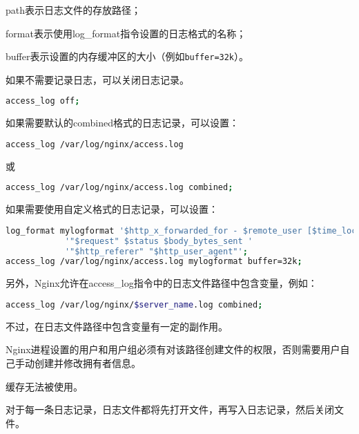 \begin{compactitem}
\item path表示日志文件的存放路径；
\item format表示使用log\_format指令设置的日志格式的名称；
\item buffer表示设置的内存缓冲区的大小（例如\texttt{buffer=32k}）。
\end{compactitem}

\begin{compactenum}
\item 如果不需要记录日志，可以关闭日志记录。

\begin{lstlisting}[language=bash]
access_log off;
\end{lstlisting}

\item 如果需要默认的combined格式的日志记录，可以设置：

\begin{lstlisting}[language=bash]
access_log /var/log/nginx/access.log
\end{lstlisting}

或

\begin{lstlisting}[language=bash]
access_log /var/log/nginx/access.log combined;
\end{lstlisting}

\item 如果需要使用自定义格式的日志记录，可以设置：

\begin{lstlisting}[language=bash]
log_format mylogformat '$http_x_forwarded_for - $remote_user [$time_local] '
			'"$request" $status $body_bytes_sent '
			'"$http_referer" "$http_user_agent"';
access_log /var/log/nginx/access.log mylogformat buffer=32k;
\end{lstlisting}


\end{compactenum}

另外，Nginx允许在access\_log指令中的日志文件路径中包含变量，例如：


\begin{lstlisting}[language=bash]
access_log /var/log/nginx/$server_name.log combined;
\end{lstlisting}

不过，在日志文件路径中包含变量有一定的副作用。

\begin{compactitem}
\item Nginx进程设置的用户和用户组必须有对该路径创建文件的权限，否则需要用户自己手动创建并修改拥有者信息。

\item 缓存无法被使用。

\item 对于每一条日志记录，日志文件都将先打开文件，再写入日志记录，然后关闭文件。

\end{compactitem}


